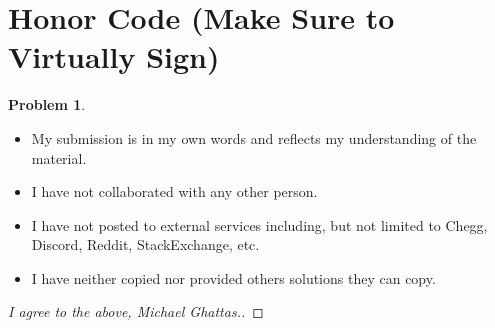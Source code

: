 \documentclass[11pt]{article}
\theoremstyle{definition}
\theoremstyle{definition}
\newtheorem{required}{Problem}
\theoremstyle{definition}
\begin{document}
\section{Honor Code (Make Sure to Virtually Sign)} \label{HonorCode}

\begin{required}
\noindent 
\begin{itemize}
\item My submission is in my own words and reflects my understanding of the material.
\item I have not collaborated with any other person.
\item I have not posted to external services including, but not limited to Chegg, Discord, Reddit, StackExchange, etc.
\item I have neither copied nor provided others solutions they can copy.
\end{itemize}

\end{required}

\begin{proof}[I agree to the above, Michael Ghattas.]
\end{proof}


\newpage
\end{document}
